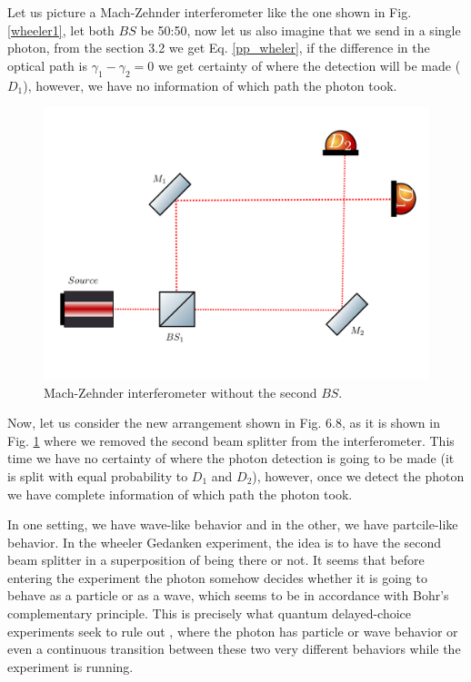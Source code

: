 \documentclass[12pt]{book}
\begin{document}
Let us picture a Mach-Zehnder interferometer like the one shown in Fig. \ref{wheeler1}, let both $BS$ be 50:50, now let us also imagine that we send in a single photon, from the section 3.2 we get Eq. \ref{pp_wheler}, if the difference in the optical path is $\gamma_{1}-\gamma_{2}=0$  we get certainty of where the detection will be made ($D_{1}$), however, we have no information of which path the photon took.

\begin{figure}[H]
\centering
\includegraphics[width=\linewidth,height=6.5 cm]{images/wheeler2.png}
\caption{Mach-Zehnder interferometer without the second $BS$.}
\label{wheeler2}
\end{figure}

Now, let us consider the new arrangement shown in Fig. 6.8, as it is shown in Fig. \ref{wheeler2} where we removed the second beam splitter from the interferometer. This time we have no certainty of where the photon detection is going to be made (it is split with equal probability to $D_{1}$ and $D_{2}$), however, once we detect the photon we have complete information of which path the photon took.



In one setting, we have wave-like behavior and in the other, we have partcile-like behavior. In the wheeler Gedanken experiment, the idea is to have the second beam splitter in a superposition of being there or not. It seems that before entering the experiment the photon somehow decides whether it is going to behave as a particle or as a wave, which seems to be in accordance with Bohr's complementary principle. This is precisely what quantum delayed-choice experiments seek to rule out \cite{Ma}, where the photon has particle or wave behavior or even a continuous transition between these two very different behaviors while the experiment is running.
\end{document}
